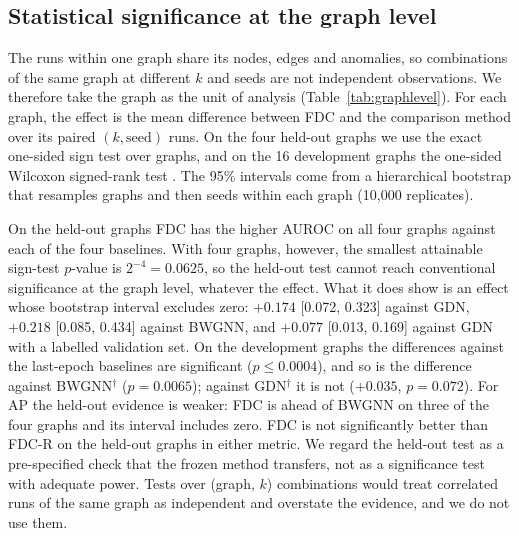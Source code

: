 \documentclass[pdflatex,sn-mathphys-ay]{sn-jnl}
\theoremstyle{plain}
\theoremstyle{remark}
\begin{document}
\subsection{Statistical significance at the graph level}\label{sec:signif}

The runs within one graph share its nodes, edges and anomalies, so combinations of the same graph at different $k$ and seeds are not independent observations. We therefore take the graph as the unit of analysis (Table~\ref{tab:graphlevel}). For each graph, the effect is the mean difference between FDC and the comparison method over its paired $(k,\text{seed})$ runs. On the four held-out graphs we use the exact one-sided sign test over graphs, and on the 16 development graphs the one-sided Wilcoxon signed-rank test \citep{wilcoxon1945individual,demsar2006statistical}. The 95\% intervals come from a hierarchical bootstrap that resamples graphs and then seeds within each graph (10{,}000 replicates).

On the held-out graphs FDC has the higher AUROC on all four graphs against each of the four baselines. With four graphs, however, the smallest attainable sign-test $p$-value is $2^{-4}=0.0625$, so the held-out test cannot reach conventional significance at the graph level, whatever the effect. What it does show is an effect whose bootstrap interval excludes zero: $+0.174$ [0.072, 0.323] against GDN, $+0.218$ [0.085, 0.434] against BWGNN, and $+0.077$ [0.013, 0.169] against GDN with a labelled validation set. On the development graphs the differences against the last-epoch baselines are significant ($p\le0.0004$), and so is the difference against BWGNN$^{\dagger}$ ($p=0.0065$); against GDN$^{\dagger}$ it is not ($+0.035$, $p=0.072$). For AP the held-out evidence is weaker: FDC is ahead of BWGNN on three of the four graphs and its interval includes zero. FDC is not significantly better than FDC-R on the held-out graphs in either metric. We regard the held-out test as a pre-specified check that the frozen method transfers, not as a significance test with adequate power. Tests over (graph, $k$) combinations would treat correlated runs of the same graph as independent and overstate the evidence, and we do not use them.
\end{document}
